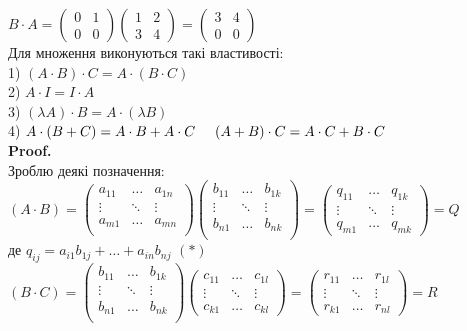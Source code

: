 \documentclass[a4paper, 14pt]{extarticle}
\def\proof{\textbf{Proof.}\\}
\def\bigline{\vspace{5mm}\\}
\begin{document}
$B \cdot A = \begin{pmatrix} 0 & 1 \\ 0 & 0 \end{pmatrix} \begin{pmatrix} 1 & 2 \\ 3 & 4 \end{pmatrix} = \begin{pmatrix} 3 & 4 \\ 0 & 0 
\end{pmatrix}$
	\bigline
	Для множення виконуються такі властивості:\\
	1) $(A \cdot B) \cdot C = A \cdot (B \cdot C)$\\
	2) $A \cdot I = I \cdot A$\\
	3) $(\lambda A) \cdot B = A \cdot (\lambda B)$\\
	4) $A \cdot (B+C) = A\cdot B + A\cdot C \hspace{0.5 cm} (A+B)\cdot C = A\cdot C + B \cdot C$\\
	\proof
	Зроблю деякі позначення: \\ $(A \cdot B) = \begin{pmatrix}
	a_{11} & \dots & a_{1n} \\
	\vdots & \ddots & \vdots \\
	a_{m1} & \dots & a_{mn} \\
	\end{pmatrix} \begin{pmatrix}
	b_{11} & \dots & b_{1k} \\
	\vdots & \ddots & \vdots \\
	b_{n1} & \dots & b_{nk} \\
	\end{pmatrix} = \begin{pmatrix}
	q_{11} & \dots & q_{1k} \\
	\vdots & \ddots & \vdots \\
	q_{m1} & \dots & q_{mk}
	\end{pmatrix} = Q$\\
	де $q_{ij} = a_{i1}b_{1j} + \dots + a_{in}b_{nj}$ $(*)$\\
	$(B \cdot C) = \begin{pmatrix}
	b_{11} & \dots & b_{1k} \\
	\vdots & \ddots & \vdots \\
	b_{n1} & \dots & b_{nk} \\
	\end{pmatrix} \begin{pmatrix}
	c_{11} & \dots & c_{1l} \\
	\vdots & \ddots & \vdots \\
	c_{k1} & \dots & c_{kl}
	\end{pmatrix} = \begin{pmatrix}
	r_{11} & \dots & r_{1l} \\
	\vdots & \ddots & \vdots \\
	r_{k1} & \dots & r_{nl}
	\end{pmatrix} = R$ \\
\end{document}
